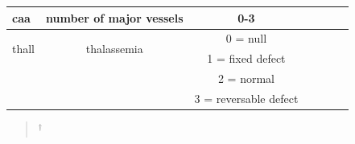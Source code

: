 \documentclass[10pt,journal]{IEEEtran}
\begin{document}
\begin{table}[th]
{\begin{tabular}{p{1.2cm} c c c p{2cm} c c }
caa & number of major vessels &  0-3 \\\hline




\multirow{2}{2cm}{thall } & \multirow{2}{2cm}{thalassemia} & 0 = null \\ & & 1 = fixed defect \\ & & 2 = normal \\ & & 3 = reversable defect\\\hline



\bottomrule
\end{tabular}%
}
\begin{quote}
\scriptsize
\centering
$^{\dagger}$ 
\end{quote}
\end{table}

 

\ifCLASSOPTIONcaptionsoff
  \newpage
\fi







~\cite{articlePredictingFuzzyCMeans}
~\cite{inbookClusteringAndAsociationRules}
~\cite{fusterbarcel_2023_unleashing}
~\cite{emmanuelramos143FeatureSelection}
~\cite{stephenallwright_2022}

%

\end{document}
